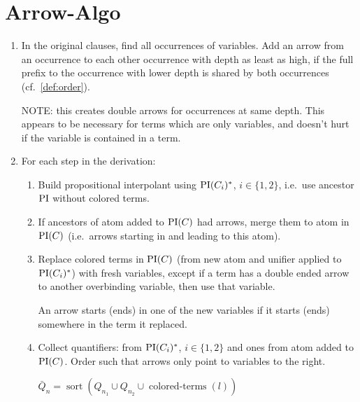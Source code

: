 \documentclass[,%
	paper=a4,%
	DIV14, 
	liststotoc,
	bibtotoc,
	draft=false,%
	numbers=noendperiod
]{scrartcl}
\begin{document}
\clearpage
\section{Arrow-Algo}

\begin{enumerate}
	\item In the original clauses, find all occurrences of variables. Add an arrow from an occurrence to each other occurrence with depth as least as high, if the full prefix to the occurrence with lower depth is shared by both occurrences (cf.~\ref{def:order}).  

		NOTE: this creates double arrows for occurrences at same depth. This appears to be necessary for terms which are only variables, and doesn't hurt if the variable is contained in a term.

		\item For each step in the derivation:
			\begin{enumerate}
				\item Build propositional interpolant using $\operatorname{PI}(C_i)^*$, $i\in \{1,2\}$, i.e.~use ancestor $\operatorname{PI}$ without colored terms.
				\item If ancestors of atom added to $\operatorname{PI}(C)$ had arrows, merge them to atom in $\operatorname{PI}(C)$ (i.e.~arrows starting in and leading to this atom).
				\item Replace colored terms in $\operatorname{PI}(C)$ (from new atom and unifier applied to $\operatorname{PI}(C_i)^*$) with fresh variables, except if a term has a double ended arrow to another overbinding variable, then use that variable.

					An arrow starts (ends) in one of the new variables if it starts (ends) somewhere in the term it replaced.
				\item Collect quantifiers: from $\operatorname{PI}(C_i)^*$, $i\in \{1,2\}$ and ones from atom added to $\operatorname{PI}(C)$. Order such that arrows only point to variables to the right.

					$\bar Q_n = \operatorname{sort}( Q_{n_1} \cup Q_{n_2} \cup \operatorname{colored-terms}(l))$
			\end{enumerate}
\end{enumerate}
\end{document}
